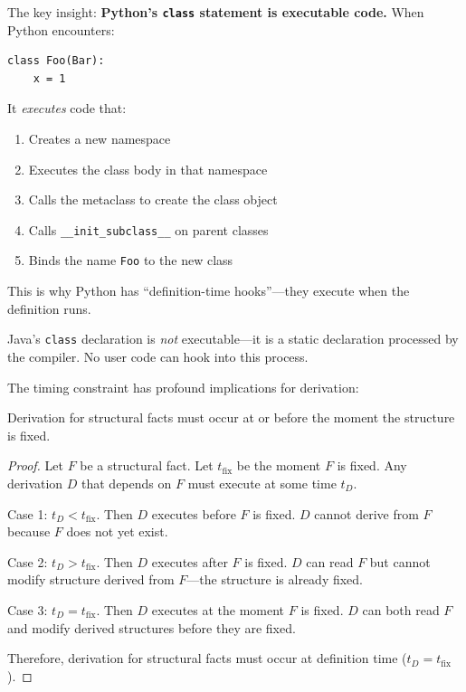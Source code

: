 The key insight: \textbf{Python's \texttt{class} statement is executable code.} When Python encounters:

\begin{verbatim}
class Foo(Bar):
    x = 1
\end{verbatim}

It \emph{executes} code that:
\begin{enumerate}
\tightlist
\item Creates a new namespace
\item Executes the class body in that namespace
\item Calls the metaclass to create the class object
\item Calls \texttt{\_\_init\_subclass\_\_} on parent classes
\item Binds the name \texttt{Foo} to the new class
\end{enumerate}

This is why Python has ``definition-time hooks''---they execute when the definition runs.

Java's \texttt{class} declaration is \emph{not} executable---it is a static declaration processed by the compiler. No user code can hook into this process.

The timing constraint has profound implications for derivation:

\begin{theorem}\label{thm:timing-forces}
Derivation for structural facts must occur at or before the moment the structure is fixed.
\end{theorem}

\begin{proof}
Let $F$ be a structural fact. Let $t_{\text{fix}}$ be the moment $F$ is fixed. Any derivation $D$ that depends on $F$ must execute at some time $t_D$.

Case 1: $t_D < t_{\text{fix}}$. Then $D$ executes before $F$ is fixed. $D$ cannot derive from $F$ because $F$ does not yet exist.

Case 2: $t_D > t_{\text{fix}}$. Then $D$ executes after $F$ is fixed. $D$ can read $F$ but cannot modify structure derived from $F$---the structure is already fixed.

Case 3: $t_D = t_{\text{fix}}$. Then $D$ executes at the moment $F$ is fixed. $D$ can both read $F$ and modify derived structures before they are fixed.

Therefore, derivation for structural facts must occur at definition time ($t_D = t_{\text{fix}}$).
\end{proof}

